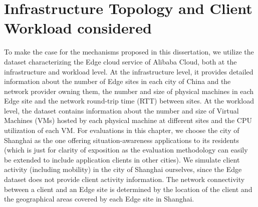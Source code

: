 \section{Infrastructure Topology and Client Workload considered}
\label{sec:nep_infra_topology}
\par To make the case for the mechanisms proposed in this dissertation, we utilize the dataset \cite{xu2021cloud} characterizing the Edge cloud service of Alibaba Cloud, both at the infrastructure and workload level. At the infrastructure level, it provides detailed information about the number of Edge sites in each city of China and the network provider owning them, the number and size of physical machines in each Edge site and the network round-trip time (RTT) between sites. At the workload level, the dataset contains information about the number and size of Virtual Machines (VMs) hosted by each physical machine at different sites and the CPU utilization of each VM. For evaluations in this chapter, we choose the city of Shanghai as the one offering situation-awareness applications to its residents (which is just for clarity of exposition as the evaluation methodology can easily be extended to include application clients in other cities). We simulate client activity (including mobility) in the city of Shanghai ourselves, since the Edge dataset \cite{xu2021cloud} does not provide client activity information. The network connectivity between a client and an Edge site is determined by the location of the client and the geographical areas covered by each Edge site in Shanghai.
